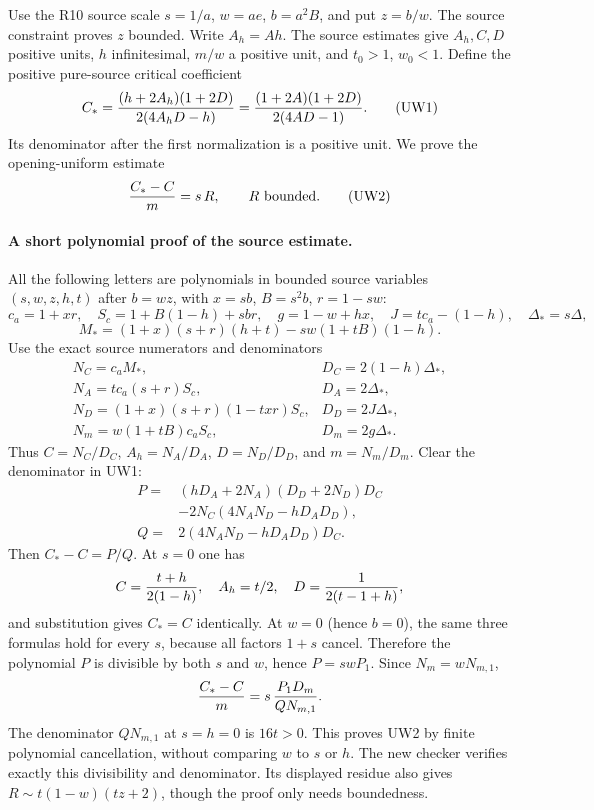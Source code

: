 Use the R10 source scale $s=1/a$, $w=ae$, $b=a^2B$, and put
$z=b/w$. The source constraint proves $z$ bounded. Write $A_h=Ah$.
The source estimates give $A_h,C,D$ positive units, $h$ infinitesimal,
$m/w$ a positive unit, and $t_0>1$, $w_0<1$.
Define the positive pure-source critical coefficient
\[
 C_*={ (h+2A_h)(1+2D)\over 2(4A_hD-h)}
     ={(1+2A)(1+2D)\over2(4AD-1)}.
 \tag{UW1}
\]
Its denominator after the first normalization is a positive unit.
We prove the opening-uniform estimate
\[
                 {C_*-C\over m}=s\,R,
                 \qquad R\text{ bounded}.             \tag{UW2}
\]

\paragraph{A short polynomial proof of the source estimate.}
All the following letters are polynomials in bounded source variables
$(s,w,z,h,t)$ after $b=wz$, with $x=sb$, $B=s^2b$, $r=1-sw$:
\[
 c_a=1+xr,\quad S_c=1+B(1-h)+sbr,\quad
 g=1-w+hx,\quad J=t c_a-(1-h),\quad \Delta_*=s\Delta,
\]
\[
 M_*=(1+x)(s+r)(h+t)-sw(1+tB)(1-h).
\]
Use the exact source numerators and denominators
\[
 \begin{array}{ll}
 N_C=c_aM_*,&D_C=2(1-h)\Delta_*,\\
 N_A=t c_a(s+r)S_c,&D_A=2\Delta_*,\\
 N_D=(1+x)(s+r)(1-txr)S_c,&D_D=2J\Delta_*,\\
 N_m=w(1+tB)c_aS_c,&D_m=2g\Delta_*.
 \end{array}
\]
Thus $C=N_C/D_C$, $A_h=N_A/D_A$, $D=N_D/D_D$,
and $m=N_m/D_m$. Clear the denominator in UW1:
\[
 \begin{split}
 P={}&(hD_A+2N_A)(D_D+2N_D)D_C\\
     &-2N_C(4N_AN_D-hD_AD_D),\\
 Q={}&2(4N_AN_D-hD_AD_D)D_C.
 \end{split}                                                  \tag{UW3}
\]
Then $C_*-C=P/Q$. At $s=0$ one has
\[
 C={t+h\over2(1-h)},\quad A_h=t/2,\quad
 D={1\over2(t-1+h)},
\]
and substitution gives $C_*=C$ identically. At $w=0$ (hence
$b=0$), the same three formulas hold for every $s$, because all
factors $1+s$ cancel. Therefore the polynomial $P$ is divisible by
both $s$ and $w$, hence $P=swP_1$. Since $N_m=wN_{m,1}$,
\[
 {C_*-C\over m}=s\,{P_1D_m\over QN_{m,1}}.
\]
The denominator $QN_{m,1}$ at $s=h=0$ is $16t>0$.
This proves UW2 by finite polynomial cancellation, without comparing
$w$ to $s$ or $h$. The new checker verifies exactly this divisibility
and denominator. Its displayed residue also gives
$R\sim t(1-w)(tz+2)$, though the proof only needs boundedness.


